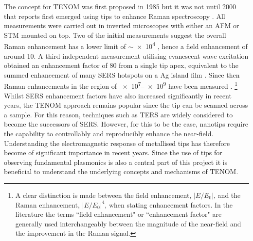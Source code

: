 \documentclass{article}
\begin{document}
The concept for TENOM was first proposed in 1985 \cite{wessel1985} but it was not until 2000 that reports first emerged using tips to enhance Raman spectroscopy \cite{stockle2000, anderson2000, hayazawa2000, pettinger2000}. All measurements were carried out in inverted microscopes with either an AFM \cite{stockle2000, anderson2000, hayazawa2000} or STM \cite{pettinger2000} mounted on top. Two of the initial measurements suggest the overall Raman enhancement has a lower limit of $\sim$\num{e4} \cite{stockle2000, anderson2000}, hence a field enhancement of around 10. A third independent measurement utilising evanescent wave excitation obtained an enhancement factor of 80 from a single tip apex, equivalent to the summed enhancement of many SERS hotspots on a Ag island film \cite{hayazawa2000}. Since then Raman enhancements in the region of \num{e7}--\num{e9} have been measured \cite{pettinger2012}.%
\footnote{A clear distinction is made between the field enhancement, $|E/E_0|$, and the Raman enhancement, $|E/E_0|^4$, when stating enhancement factors. In the literature the terms ``field enhancement" or ``enhancement factor" are generally used interchangeably between the magnitude of the near-field and the improvement in the Raman signal.}
Whilst SERS enhancement factors have also increased significantly in recent years, the TENOM approach remains popular since the tip can be scanned across a sample. For this reason, techniques such as TERS are widely considered to become the successors of SERS. However, for this to be the case, nanotips require the capability to controllably and reproducibly enhance the near-field. Understanding the electromagnetic response of metallised tips has therefore become of significant importance in recent years.
Since the use of tips for observing fundamental plasmonics is also a central part of this project it is beneficial to understand the underlying concepts and mechanisms of TENOM.
\end{document}
